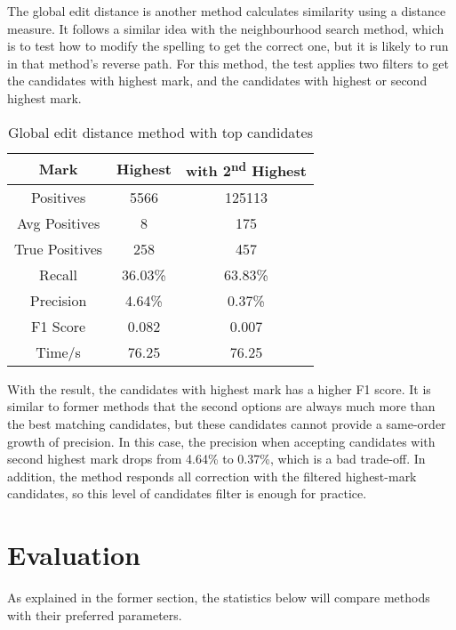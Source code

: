 \documentclass[11pt]{article}
\begin{document}
The global edit distance is another method calculates similarity using a distance measure. It follows a similar idea with the neighbourhood search method, which is to test how to modify the spelling to get the correct one, but it is likely to run in that method's reverse path. For this method, the test applies two filters to get the candidates with highest mark, and the candidates with highest or second highest mark.

\begin{table}[h]
 \begin{center}
\begin{tabular}{ |c||c|c| }
      \hline
      Mark & Highest & with 2\textsuperscript{nd} Highest \\
      \hline
      Positives & 5566 & 125113\\
      Avg Positives & 8 & 175\\
      True Positives & 258 & 457\\
      Recall & 36.03\% & 63.83\%\\
      Precision & 4.64\% & 0.37\%\\
      F1 Score & 0.082 & 0.007\\
      Time/s & 76.25 & 76.25\\
      \hline
\end{tabular}
\caption{Global edit distance method with top candidates}\label{table4}
 \end{center}
\end{table}

With the result, the candidates with highest mark has a higher F1 score. It is similar to former methods that the second options are always much more than the best matching candidates, but these candidates cannot provide a same-order growth of precision. In this case, the precision when accepting candidates with second highest mark drops from 4.64\% to 0.37\%, which is a bad trade-off. In addition, the method responds all correction with the filtered highest-mark candidates, so this level of candidates filter is enough for practice.


\section{Evaluation}
As explained in the former section, the statistics below will compare methods with their preferred parameters.
 
\end{document}
